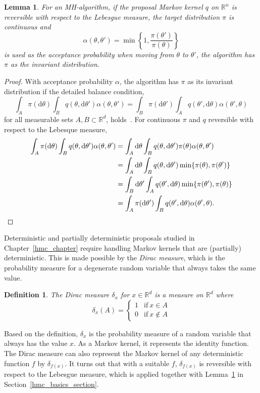 \documentclass[english,twoside,openright]{HYgraduMLDS}
\newtheorem{lemma}{Lemma}
\newtheorem{definition}{Definition}
\newcommand{\R}{\mathbb{R}}
\newcommand{\dx}{\mathrm{d}}
\begin{document}
\begin{lemma}\label{reversible_proposal_lemma}
  For an MH-algorithm,
  if the proposal Markov kernel \(q\) on \(\R^{n}\) is reversible with
  respect to the
  Lebesgue measure, the target distribution \(\pi\) is continuous and
  \[
    \alpha(\theta, \theta') = \min\left\{1, \frac{\pi(\theta')}{\pi(\theta)}\right\}
  \]
  is used as the acceptance probability when moving from \(\theta\) to \(\theta'\),
  the algorithm has \(\pi\) as the invariant distribution.
\end{lemma}
\begin{proof}
  With acceptance probability \(\alpha\), the algorithm has \(\pi\) as its
  invariant distribution if the detailed balance condition,
  \[
    \int_{A}\pi(\dx \theta)\int_{B}q(\theta, \dx \theta')\alpha(\theta, \theta')
    = \int_{B}\pi(\dx \theta')\int_{A}q(\theta', \dx \theta)\alpha(\theta', \theta)
  \]
  for all measurable sets \(A, B\subset \R^{d}\), holds~\cite{Tie98}.
  For continuous \(\pi\) and \(q\) reversible with respect to the Lebesque measure,
  \begin{align*}
    \int_{A}\pi(\dx \theta)\int_{B}q(\theta, \dx \theta')\alpha(\theta, \theta')
    &= \int_{A}\dx \theta\int_{B}q(\theta, \dx \theta')\pi(\theta)\alpha(\theta, \theta')
    \\&= \int_{A}\dx\theta\int_{B}q(\theta, \dx \theta')\min\{\pi(\theta), \pi(\theta')\}
    \\&= \int_{B}\dx\theta'\int_{A}q(\theta', \dx \theta)\min\{\pi(\theta'), \pi(\theta)\}
    \\&= \int_{A}\pi(\dx \theta')\int_{B}q(\theta', \dx \theta)\alpha(\theta', \theta).
    \qedhere
  \end{align*}
\end{proof}

Deterministic and partially deterministic proposals studied in
Chapter~\ref{hmc_chapter} require handling Markov kernels that are (partially)
deterministic. This is made possible by the \emph{Dirac measure}, which is
the probability measure for a degenerate random variable that always takes
the same value.
\begin{definition}
	The Dirac measure \(\delta_{x}\) for \(x\in \R^{d}\) is a measure on \(\R^{d}\)
  where
  \[
    \delta_{x}(A) = \begin{cases}
      1 & \mathrm{if}\  x\in A\\
      0 & \mathrm{if}\  x\notin A
    \end{cases}
  \]
\end{definition}
Based on the definition, \(\delta_{x}\) is the probability measure of a random
variable that always has the value \(x\). As a Markov kernel, it represents
the identity function. The Dirac measure can also represent the Markov kernel
of any deterministic function \(f\) by \(\delta_{f(x)}\). It turns out that
with a suitable \(f\), \(\delta_{f(x)}\) is reversible with respect to the
Lebesgue measure, which is applied together with
Lemma~\ref{reversible_proposal_lemma} in Section~\ref{hmc_basics_section}.
\end{document}
